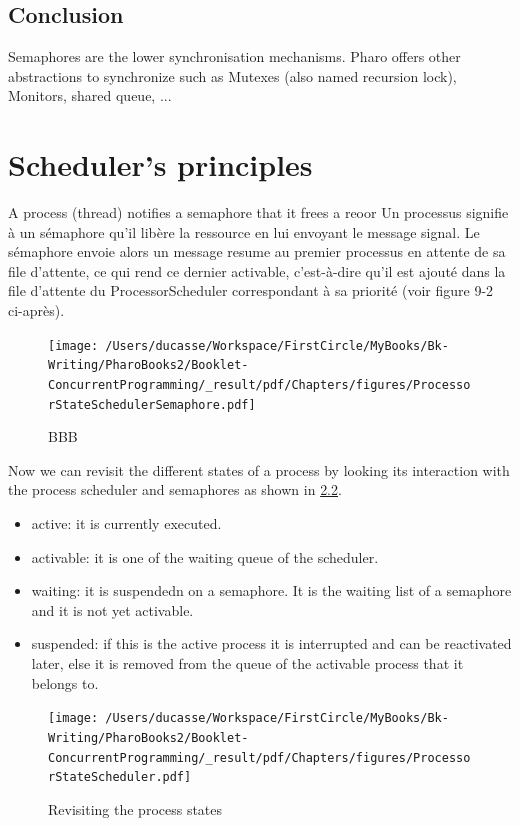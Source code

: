 \documentclass[10pt,twoside,english]{_support/latex/sbabook/sbabook}
\begin{document}
\section{Conclusion}
Semaphores are the lower synchronisation mechanisms. 
Pharo offers other abstractions to synchronize such as Mutexes (also named recursion lock), Monitors, shared queue, ...
\chapter{Scheduler's principles}
A process (thread) notifies a semaphore that it frees a reoor
Un processus signifie \`{a} un s\'{e}maphore qu’il lib\`{e}re la ressource en lui envoyant le message signal. 
Le s\'{e}maphore envoie alors un message resume au premier processus en attente de sa file d’attente, 
ce qui rend ce dernier activable, c’est-\`{a}-dire qu’il est ajout\'{e} dans la file d’attente du 
ProcessorScheduler correspondant \`{a} sa priorit\'{e} (voir figure 9-2 ci-apr\`{e}s).


\begin{figure}

\begin{center}
\texttt{[image: /Users/ducasse/Workspace/FirstCircle/MyBooks/Bk-Writing/PharoBooks2/Booklet-ConcurrentProgramming/\_result/pdf/Chapters/figures/ProcessorStateSchedulerSemaphore.pdf]}\caption{BBB\label{ProcessorStateSchedulerSemaphore}}\end{center}
\end{figure}


Now we can revisit the different states of a process by looking its interaction with the process scheduler and 
semaphores as shown in \ref{ProcessorStateScheduler}.

\begin{itemize}
\item active: it is currently executed.
\item activable: it is one of the waiting queue of the scheduler.
\item waiting: it is suspendedn on a semaphore. It is the waiting list of a semaphore and it is not yet activable.
\item suspended: if this is the active process it is interrupted and can be reactivated later, else it is removed from the queue of the activable process that it belongs to. 
\end{itemize}


\begin{figure}

\begin{center}
\texttt{[image: /Users/ducasse/Workspace/FirstCircle/MyBooks/Bk-Writing/PharoBooks2/Booklet-ConcurrentProgramming/\_result/pdf/Chapters/figures/ProcessorStateScheduler.pdf]}\caption{Revisiting the process states\label{ProcessorStateScheduler}}\end{center}
\end{figure}
\end{document}
